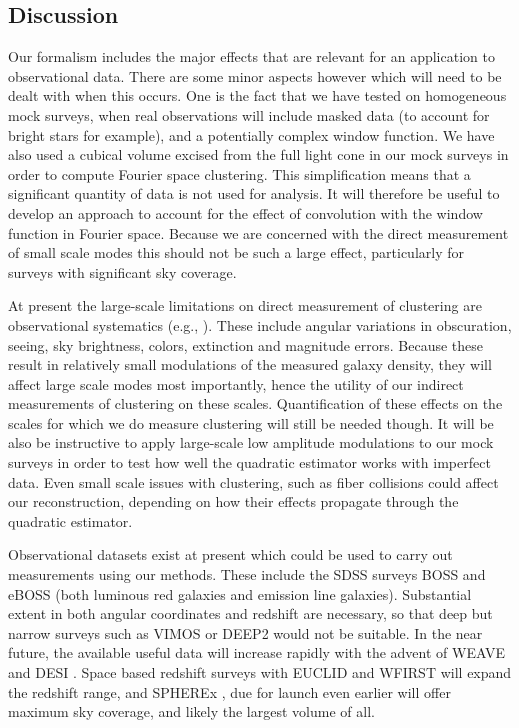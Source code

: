 \documentclass[prd,amsmath,amssymb,floatfix,superscriptaddress,nofootinbib,twocolumn]{revtex4-1}
\begin{document}
\subsection{Discussion}

Our formalism includes the major effects that are relevant for an application to observational data. There are some minor aspects however which will need to be dealt with when this occurs. One is the fact that we have tested on homogeneous mock surveys, when real observations will include masked data (to account for bright stars for example), and a potentially complex window function. We have also used a cubical volume excised from the full light cone in our mock surveys in order to compute Fourier space clustering. This simplification means that a significant quantity of data is not used for analysis. It will therefore be useful to develop an approach to account for the effect of convolution with the window function in Fourier space. Because we are concerned with the direct measurement of small scale modes this should not be such a large effect, particularly for surveys with significant sky coverage.

At present the large-scale limitations on direct measurement of clustering are observational systematics (e.g., \cite{Ho:2012sh}). These include angular variations in obscuration, seeing, sky brightness, colors, extinction and magnitude errors. Because these result in relatively small modulations of the measured galaxy density, they will affect large scale modes most importantly, hence the utility of our indirect measurements of clustering on these scales. Quantification of these effects on the scales for which we do measure clustering will still be needed though. It will be also be instructive to apply large-scale low amplitude modulations to our mock surveys in order to test how well the quadratic estimator works with imperfect data. Even small scale issues with clustering, such as fiber collisions \cite{Hahn:2016kiy} could affect our reconstruction, depending on how their effects propagate through the quadratic estimator.

Observational datasets exist at present which could be used to carry out measurements using our methods. These include the SDSS surveys BOSS \cite{Dawson:2013boss} and eBOSS \cite{Dawson:2015wdb} (both luminous red galaxies and emission line galaxies). Substantial extent in both angular coordinates and redshift are necessary, so that deep but narrow surveys such as VIMOS \cite{Fevre:2014tna} or DEEP2 \cite{Coil:2005ap} would not be suitable. In the near future, the available useful data will increase rapidly with the advent of WEAVE \cite{Dalton:2014wv} and DESI \cite{DESI:2019ds}. Space based redshift surveys  with EUCLID \cite{Amiaux:2012ec} and WFIRST \cite{Wfirst:2012jg} will expand the redshift range, and SPHEREx \cite{Dore:2014cca}, due for launch even earlier will offer maximum sky coverage, and likely the largest volume of all.
\end{document}
